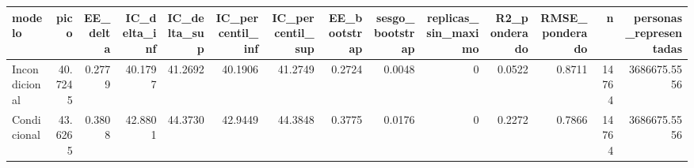\begin{tabular}{lrrrrrrrrrrrrr}
\toprule
modelo & pico & EE\_delta & IC\_delta\_inf & IC\_delta\_sup & IC\_percentil\_inf & IC\_percentil\_sup & EE\_bootstrap & sesgo\_bootstrap & replicas\_sin\_maximo & R2\_ponderado & RMSE\_ponderado & n & personas\_representadas \\
\midrule
Incondicional & 40.7245 & 0.2779 & 40.1797 & 41.2692 & 40.1906 & 41.2749 & 0.2724 & 0.0048 & 0 & 0.0522 & 0.8711 & 14764 & 3686675.5556 \\
Condicional & 43.6265 & 0.3808 & 42.8801 & 44.3730 & 42.9449 & 44.3848 & 0.3775 & 0.0176 & 0 & 0.2272 & 0.7866 & 14764 & 3686675.5556 \\
\bottomrule
\end{tabular}
